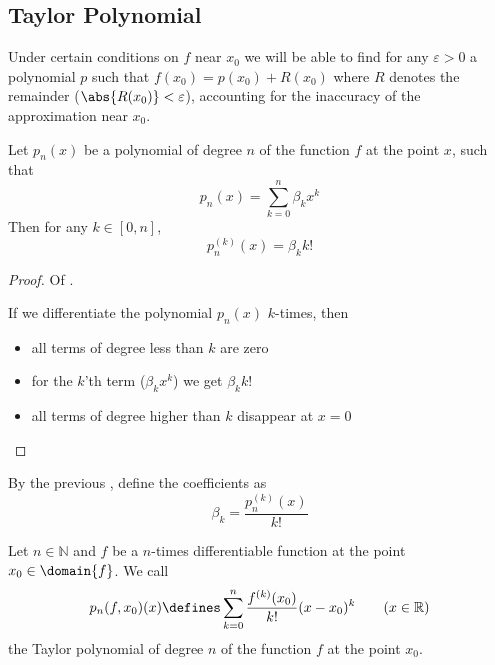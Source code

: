\subsection{Taylor Polynomial}\label{subsec-taylor-polynomial}

Under certain conditions on $f$ near $x_0$ we will be able to find for any $\varepsilon>0$
a polynomial $p$ such that $f(x_0)=p(x_0)+R(x_0)$ where $R$ denotes the remainder ($\abs{R(x_0)}<\varepsilon$),
accounting for the inaccuracy of the approximation near $x_0$.

\begin{lemma}\label{lemma-polynomial-derivatives}
	Let $p_n(x)$ be a polynomial of degree $n$ of the function $f$ at the point $x$,
	such that
	\begin{equation}\label{eq-polynomial-derivatives:1}
		p_n(x) = \sum_{k=0}^n \beta_k x^k
	\end{equation}
	Then for any $k\in[0,n]$,
	\begin{equation}\label{eq-polynomial-derivatives:2}
		p_n^{(k)}(x) = \beta_k k!
	\end{equation}
\end{lemma}

\begin{proof}
	Of .
	\begin{flushleft}
		If we differentiate the polynomial $p_n(x)$ $k$-times, then
		\begin{itemize}
			\item all terms of degree less than $k$ are zero
			\item for the $k$'th term ($\beta_k x^k$) we get $\beta_k k!$
			\item all terms of degree higher than $k$ disappear at $x=0$
		\end{itemize}
	\end{flushleft}
\end{proof}

\begin{rem}
	By the previous , define the coefficients as
	\begin{equation*}
		\beta_k = \frac{p_n^{(k)}(x)}{k!}
	\end{equation*}
\end{rem}

\begin{definition}\label{def-taylor-polynomial}
	Let $n\in\mathbb{N}$ and $f$ be a $n$-times differentiable function at the point
	$x_0\in\domain{f}$. We call \cite[p.214]{wuest2009}
	\begin{equation}\label{eq-taylor-polynomial}
		p_n(f,x_0)(x) \defines \sum_{k=0}^n \frac{f^{(k)}(x_0)}{k!}(x-x_0)^k \qquad(x\in\mathbb{R})
	\end{equation}
	the Taylor polynomial of degree $n$ of the function $f$ at the point $x_0$.
\end{definition}

